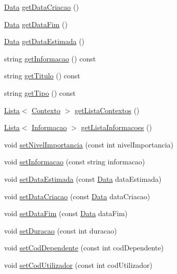 \begin{DoxyCompactItemize}
\item 
\hyperlink{class_data}{Data} \hyperlink{class_tarefa_acceb78bd71db1b041b3199eec2db0b53}{get\-Data\-Criacao} ()
\item 
\hyperlink{class_data}{Data} \hyperlink{class_tarefa_abb6c005bec5e57d515f97aa8d7103f08}{get\-Data\-Fim} ()
\item 
\hyperlink{class_data}{Data} \hyperlink{class_tarefa_aac9cee9cff017af3d21c01b2038fbb70}{get\-Data\-Estimada} ()
\item 
string \hyperlink{class_tarefa_a9c6df2bb0c78c8702cd3b125225754ec}{get\-Informacao} () const 
\item 
string \hyperlink{class_tarefa_a5c4fca9fc2f08dc569460e01fd894799}{get\-Titulo} () const 
\item 
string \hyperlink{class_tarefa_a74ae175b0d90c4b2e2273173de6872ab}{get\-Tipo} () const 
\item 
\hyperlink{class_lista}{Lista}$<$ \hyperlink{class_contexto}{Contexto} $>$ \hyperlink{class_tarefa_a1098feb5c842c43b5d7376edc798936c}{get\-Lista\-Contextos} ()
\item 
\hyperlink{class_lista}{Lista}$<$ \hyperlink{class_informacao}{Informacao} $>$ \hyperlink{class_tarefa_a3409664169de2c5e2bc79f3dc6226847}{get\-Lista\-Informacoes} ()
\item 
void \hyperlink{class_tarefa_a460882d0d19d62a2dc11a5bedd0ac009}{set\-Nivel\-Importancia} (const int nivel\-Importancia)
\item 
void \hyperlink{class_tarefa_ac37a73882fd67ad9f02044bb772f7258}{set\-Informacao} (const string informacao)
\item 
void \hyperlink{class_tarefa_af925b390c42d3f8ccca656d0ddedb379}{set\-Data\-Estimada} (const \hyperlink{class_data}{Data} data\-Estimada)
\item 
void \hyperlink{class_tarefa_ad3d8f9f57b64bcbd750c1bb2ade1c258}{set\-Data\-Criacao} (const \hyperlink{class_data}{Data} data\-Criacao)
\item 
void \hyperlink{class_tarefa_aa0198d072b121a182debe593e7de584a}{set\-Data\-Fim} (const \hyperlink{class_data}{Data} data\-Fim)
\item 
void \hyperlink{class_tarefa_acb6d22840700c9dd5348aaab8b1ea638}{set\-Duracao} (const int duracao)
\item 
void \hyperlink{class_tarefa_af5f497e76c3ba01620a34bdd4645ba1e}{set\-Cod\-Dependente} (const int cod\-Dependente)
\item 
void \hyperlink{class_tarefa_af2ca42600e5746b52b9b69e091101088}{set\-Cod\-Utilizador} (const int cod\-Utilizador)

\end{DoxyCompactItemize}
